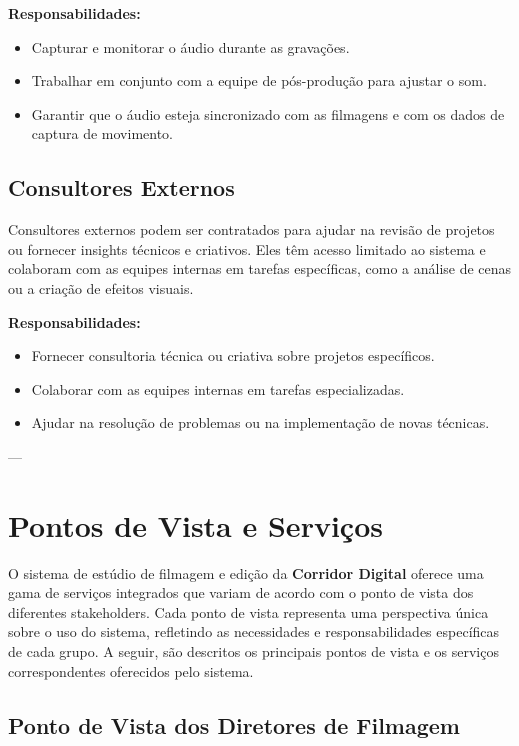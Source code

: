 \textbf{Responsabilidades:}
\begin{itemize}
  \item Capturar e monitorar o áudio durante as gravações.
  \item Trabalhar em conjunto com a equipe de pós-produção para ajustar o som.
  \item Garantir que o áudio esteja sincronizado com as filmagens e com os dados de captura de movimento.
\end{itemize}

\subsection{Consultores Externos}
Consultores externos podem ser contratados para ajudar na revisão de projetos ou fornecer insights técnicos e criativos. Eles têm acesso limitado ao sistema e colaboram com as equipes internas em tarefas específicas, como a análise de cenas ou a criação de efeitos visuais.

\textbf{Responsabilidades:}
\begin{itemize}
  \item Fornecer consultoria técnica ou criativa sobre projetos específicos.
  \item Colaborar com as equipes internas em tarefas especializadas.
  \item Ajudar na resolução de problemas ou na implementação de novas técnicas.
\end{itemize}

---



\section{Pontos de Vista e Serviços}

O sistema de estúdio de filmagem e edição da \textbf{Corridor Digital} oferece uma gama de serviços integrados que variam de acordo com o ponto de vista dos diferentes stakeholders. Cada ponto de vista representa uma perspectiva única sobre o uso do sistema, refletindo as necessidades e responsabilidades específicas de cada grupo. A seguir, são descritos os principais pontos de vista e os serviços correspondentes oferecidos pelo sistema.

\subsection{Ponto de Vista dos Diretores de Filmagem}


